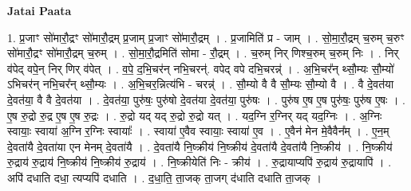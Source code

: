 \documentclass[17pt]{extarticle}
\begin{document}
\textbf{Jatai Paata} \newline

1. प्र॒जाꣳ सो॑मारौ॒द्रꣳ सो॑मारौ॒द्रम् प्र॒जाम् प्र॒जाꣳ सो॑मारौ॒द्रम् । . प्र॒जामिति॑ प्र - जाम् । . सो॒मा॒रौ॒द्रम् च॒रुम् च॒रुꣳ सो॑मारौ॒द्रꣳ सो॑मारौ॒द्रम् च॒रुम् । . सो॒मा॒रौ॒द्रमिति॑ सोमा - रौ॒द्रम् । . च॒रुम् निर् णिश्च॒रुम् च॒रुम् निः । . निर् व॑पेद् वपे॒न् निर् णिर् व॑पेत् । . व॒पे॒ द॒भि॒चर॑न् नभि॒चरन्॑. वपेद् वपे दभि॒चरन्न्॑ । . अ॒भि॒चर᳚न् थ्सौ॒म्यः सौ॒म्यो॑ ऽभिचर॑न् नभि॒चर᳚न् थ्सौ॒म्यः । . अ॒भि॒चर॒न्नित्य॑भि - चरन्न्॑ । . सौ॒म्यो वै वै सौ॒म्यः सौ॒म्यो वै । . वै दे॒वत॑या दे॒वत॑या॒ वै वै दे॒वत॑या । . दे॒वत॑या॒ पुरु॑षः॒ पुरु॑षो दे॒वत॑या दे॒वत॑या॒ पुरु॑षः । . पुरु॑ष ए॒ष ए॒ष पुरु॑षः॒ पुरु॑ष ए॒षः । . ए॒ष रु॒द्रो रु॒द्र ए॒ष ए॒ष रु॒द्रः । . रु॒द्रो यद् यद् रु॒द्रो रु॒द्रो यत् । . यद॒ग्नि र॒ग्निर् यद् यद॒ग्निः । . अ॒ग्निः स्वायाः॒ स्वाया॑ अ॒ग्नि र॒ग्निः स्वायाः᳚ । . स्वाया॑ ए॒वैव स्वायाः॒ स्वाया॑ ए॒व । . ए॒वैन॑ मेन मे॒वैवैन᳚म् । . ए॒न॒म् दे॒वता॑यै दे॒वता॑या एन मेनम् दे॒वता॑यै । . दे॒वता॑यै नि॒ष्क्रीय॑ नि॒ष्क्रीय॑ दे॒वता॑यै दे॒वता॑यै नि॒ष्क्रीय॑ । . नि॒ष्क्रीय॑ रु॒द्राय॑ रु॒द्राय॑ नि॒ष्क्रीय॑ नि॒ष्क्रीय॑ रु॒द्राय॑ । . नि॒ष्क्रीयेति॑ निः - क्रीय॑ । . रु॒द्रायाप्यपि॑ रु॒द्राय॑ रु॒द्रायापि॑ । . अपि॑ दधाति दधा॒ त्यप्यपि॑ दधाति । . द॒धा॒ति॒ ता॒जक् ता॒जग् द॑धाति दधाति ता॒जक् । \newline
\end{document}
